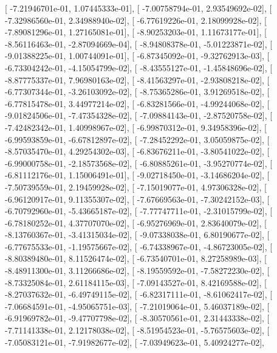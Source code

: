 \documentclass{article}
\begin{document}
       [ -7.21946701e-01,   1.07445333e-01],
       [ -7.00758794e-01,   2.93549692e-02],
       [ -7.32986560e-01,   2.34988940e-02],
       [ -6.77619226e-01,   2.18099928e-02],
       [ -7.89081296e-01,   1.27165081e-01],
       [ -8.90253203e-01,   1.11673177e-01],
       [ -8.56116463e-01,  -2.87094669e-04],
       [ -8.94808378e-01,  -5.01223871e-02],
       [ -9.01388225e-01,   1.00744091e-01],
       [ -6.87345092e-01,  -9.32762913e-03],
       [ -6.73304242e-01,  -4.15054799e-02],
       [ -8.43555127e-01,  -1.45848696e-02],
       [ -8.87775337e-01,   7.96980163e-02],
       [ -8.41563297e-01,  -2.93808218e-02],
       [ -6.77307344e-01,  -3.26103092e-02],
       [ -8.75365286e-01,   3.91269518e-02],
       [ -6.77815478e-01,   3.44977214e-02],
       [ -6.83281566e-01,  -4.99244068e-02],
       [ -9.01824506e-01,  -7.47354328e-02],
       [ -7.09884143e-01,  -2.87520758e-02],
       [ -7.42482342e-01,   1.40998967e-02],
       [ -6.99870312e-01,   9.34958396e-02],
       [ -6.99593859e-01,  -6.67812897e-02],
       [ -7.28452292e-01,   3.05059875e-02],
       [ -8.57035470e-01,   4.29254302e-03],
       [ -6.83676211e-01,  -3.80541022e-02],
       [ -6.99000758e-01,  -2.18573568e-02],
       [ -6.80885261e-01,  -3.95270774e-02],
       [ -6.81112176e-01,   1.15006491e-01],
       [ -9.02718450e-01,  -3.14686204e-02],
       [ -7.50739559e-01,   2.19459928e-02],
       [ -7.15019077e-01,   4.97306328e-02],
       [ -6.96120917e-01,   9.11355307e-02],
       [ -7.67669563e-01,  -7.30242152e-03],
       [ -6.70792960e-01,  -5.43665187e-02],
       [ -7.77747711e-01,  -2.31015799e-02],
       [ -6.78180252e-01,   4.37707070e-02],
       [ -6.95276969e-01,   2.83640079e-02],
       [ -8.13760367e-01,  -3.41315034e-02],
       [ -9.07338038e-01,   6.80190677e-02],
       [ -6.77675533e-01,  -1.19575667e-02],
       [ -6.74338967e-01,  -4.86723005e-02],
       [ -8.80389480e-01,   8.11526474e-02],
       [ -6.73540701e-01,   8.27258989e-03],
       [ -8.48911300e-01,   3.11266686e-02],
       [ -8.19559592e-01,  -7.58272230e-02],
       [ -8.73325084e-01,   2.61184115e-03],
       [ -7.09143527e-01,   8.42169588e-02],
       [ -8.27037632e-01,  -6.49749115e-02],
       [ -6.82317111e-01,  -8.61062417e-02],
       [ -7.06684591e-01,  -4.95065751e-03],
       [ -7.21019064e-01,   5.46037189e-02],
       [ -6.91969782e-01,  -9.47707798e-02],
       [ -8.30570561e-01,   2.31443338e-02],
       [ -7.71141338e-01,   2.12178038e-02],
       [ -8.51954523e-01,  -5.76575603e-02],
       [ -7.05083121e-01,  -7.91982677e-02],
       [ -7.03949623e-01,   5.40924277e-02],
\end{document}
